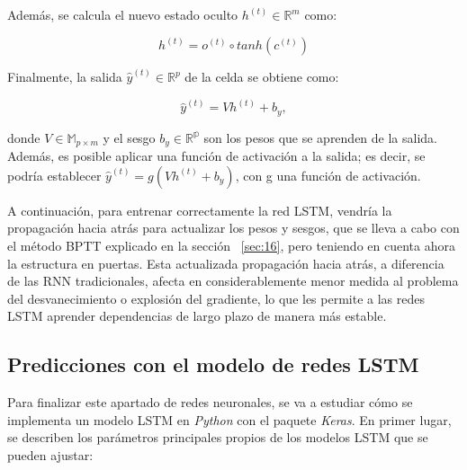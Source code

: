 \documentclass[12pt,twoside]{article}
\begin{document}
Además, se calcula el nuevo estado oculto $h^{(t)} \in \mathbb{R}^m$ como:

\begin{equation}
h^{(t)} = o^{(t)} \circ tanh(c^{(t)})
\end{equation}

Finalmente, la salida $\hat{y}^{(t)} \in \mathbb{R}^p$ de la celda se obtiene como: 

\begin{equation}
\hat{y}^{(t)} = Vh^{(t)} + b_y,
\end{equation}

donde $V \in \mathbb{M}_{p \times m}$ y el sesgo $b_y \in \mathbb{R^p}$ son los pesos que se aprenden de la salida. Además, es posible aplicar una función de activación a la salida; es decir, se podría establecer $\hat{y}^{(t)} =g( Vh^{(t)} + b_y)$, con g una función de activación.


A continuación, para entrenar correctamente la red LSTM, vendría la propagación hacia atrás para actualizar los pesos y sesgos, que se lleva a cabo con el método BPTT explicado en la sección ~\ref{sec:16}, pero teniendo en cuenta ahora la estructura en puertas. Esta actualizada propagación hacia atrás, a diferencia de las RNN tradicionales, afecta en considerablemente menor medida al problema del desvanecimiento o explosión del gradiente, lo que les permite a las redes LSTM aprender dependencias de largo plazo de manera más estable.


\subsection{Predicciones con el modelo de redes LSTM}\label{sec:18}

Para finalizar este apartado de redes neuronales, se va a estudiar cómo se implementa un modelo LSTM en \textit{Python} con el paquete \textit{Keras}. En primer lugar, se describen los parámetros \cite{rnn4} principales propios de los modelos LSTM que se pueden ajustar:
\end{document}
